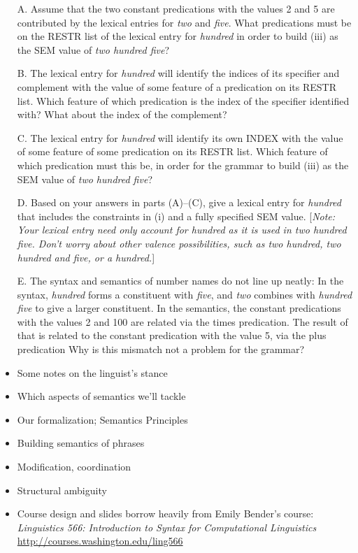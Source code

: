 \documentclass[a4paper,landscape,headrule,footrule,dvips]{foils}
\begin{document}
\begin{itemize} 

\item[A.] Assume that the two constant 
predications
with the values 2 and
5 are contributed by the lexical entries for {\it two} and {\it five}.
What predications must be on the RESTR list of the lexical entry for
{\it hundred} in order to build (iii) as the SEM value of {\it two
hundred five}?
\item[B.] The lexical entry for {\it hundred} will identify the
indices of its specifier and complement with the value of some feature
of a predication on its RESTR list.  Which feature of which predication
is the index of the specifier identified with?  What about the index
of the complement?
\item[C.] The lexical entry for {\it hundred} will identify its
own INDEX with the value of some feature of some predication on
its RESTR list.  Which feature of which predication must this
be, in order for the grammar 
to build (iii) as the SEM value of {\it two hundred five}?

\newpage

\item[D.] Based on your answers in parts (A)--(C), 
give a lexical entry for {\it hundred} that includes
the constraints in (i) and a fully specified SEM value.  
[{\sl Note: Your lexical entry need only account for {\it hundred}
as it is used in {\it two hundred five}. Don't worry about other
valence possibilities, such as 
{\it two hundred}, {\it two hundred and five}, or {\it a hundred}.}]
\item[E.] The syntax and semantics of number names do
not line up neatly: In the syntax, {\it hundred} forms a constituent
with {\it five}, and {\it two} combines with {\it hundred five} to
give a larger constituent.  In the semantics, the constant
predications
with the values 2 and 100 are related via the times 
predication.
The result of that is related to the constant 
predication
with the value
5, via the plus 
predication
Why is this mismatch not a problem for the grammar?
\end{itemize}




\begin{itemize}
\item Some notes on the linguist's stance
\item Which aspects of semantics we’ll tackle
\item Our formalization; Semantics Principles
\item Building semantics of phrases
\item Modification, coordination
\item Structural ambiguity
\end{itemize}


\begin{itemize}
\item Course design and slides borrow heavily from Emily Bender's course:
\textit{Linguistics 566: Introduction to Syntax for Computational Linguistics}
\\ \url{http://courses.washington.edu/ling566}
\end{itemize}


\end{document}
